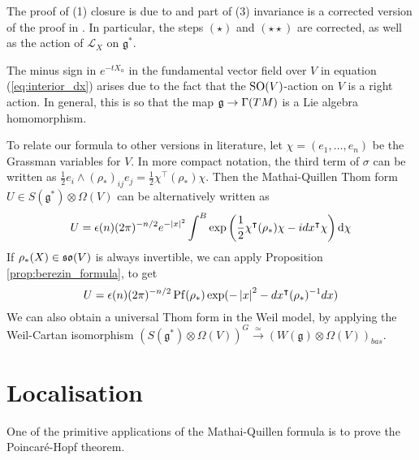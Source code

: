 The proof of (1) closure is due to \citet{guillemin} and part of (3) invariance
is a corrected version of the proof in \citet[p.27]{constantinescu}. In
particular, the steps $(\star)$ and  $(\star\star)$ are corrected, as well as
the action of $\mathcal{L}_X$ on $\mathfrak{g}^*$. 

\begin{remark}
	The minus sign in $e^{-tX_a}$ in the fundamental vector field over $V$ in
	equation (\ref{eq:interior_dx}) arises due to the fact that the
	$\operatorname{SO}(V)$-action on $V$ is a right action. In general, this is so that the
	map $\operatorname{\mathfrak{g}} \to \Gamma(TM)$ is a Lie algebra homomorphism. 
\end{remark}	
 
To relate our formula to other versions in literature, let $\chi =
(e_1,\ldots,e_n)$ be the Grassman variables for $V$. 
In more compact notation, the third term of $\sigma$ can be written  
as $\frac{1}{2} e_i \wedge (\rho_*)_{ij} e_j = \frac{1}{2} \chi^\intercal
(\rho_*) \chi$. Then the Mathai-Quillen Thom form 
$U\in S(\mathfrak{g}^*)\otimes \Omega(V)$ can be alternatively written as 
\begin{equation} \label{eq:universal_thom_form} %
	U = \epsilon(n)(2\pi)^{-n /2}e^{-\abs{x}^2} 
	\int^B \exp \paren{\frac{1}{2}\chi^{\intercal}(\rho_*)\chi -
idx^{\intercal}\chi} \odif{\chi} 
\end{equation}
If $\rho_*(X)\in\operatorname{\mathfrak{so}}(V)$ is always invertible, we can apply
Proposition \ref{prop:berezin_formula}, to get
\[
	U = \epsilon(n)(2\pi)^{-n/2} \Pf(\rho_*) \exp(-\abs{x}^2-dx^{\intercal} (\rho_*)^{-1}dx)
\] 
We can also obtain a universal Thom form in the Weil model, by 
applying the Weil-Cartan isomorphism $(S(\mathfrak{g}^*)\otimes \Omega(V))^G
\xrightarrow{\simeq}(W(\mathfrak{g})\otimes \Omega(V))_{bas}$. 

\begin{comment} %
\[%
		U = (2\pi)^{-m} \Pf(\phi) \exp(-\abs{x}^2-\gen{\nabla x,\phi^{-1}\nabla x})
\] 
\[%
	U = (2\pi)^{-m}\Pf(\Omega) \exp(-x^2-(dx+\theta x)^\intercal \Omega^{-1}
	(dx+\theta x))
\]
\end{comment}
\section{Localisation}
One of the primitive applications of the Mathai-Quillen formula is to prove the
Poincar\'e-Hopf theorem. 

